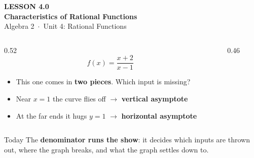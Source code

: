 \documentclass[aspectratio=169, 11pt]{beamer}
\newcommand{\lgrid}[4]{%
  \draw[step=1, linegray!45, thin] (#1,#3) grid (#2,#4);
  \draw[->, thick, charcoal] (#1,0)--(#2,0) node[below right, font=\tiny]{$x$};
  \draw[->, thick, charcoal] (0,#3)--(0,#4) node[left, font=\tiny]{$y$};}
\begin{document}
{
\begin{frame}[plain]
  \vspace{2.8cm}\hspace{0.55cm}%
  \begin{minipage}{0.9\textwidth}
    {\color{goldacc}\bfseries\small LESSON 4.0}\\[0.5cm]
    {\color{white}\bfseries\LARGE Characteristics of Rational Functions}\\[1.2cm]
    {\color{forestmid}\small Algebra 2~$\cdot$~Unit 4: Rational Functions}
  \end{minipage}
\end{frame}
}

\begin{frame}[t, plain]
  \begin{columns}[T]
    \begin{column}{0.52\textwidth}
      \[ f(x) = \frac{x+2}{x-1} \]
      \begin{itemize}\setlength{\itemsep}{4pt}
        \item This one comes in \textbf{two pieces}. Which input is missing?
        \item Near $x=1$ the curve flies off $\to$ \textbf{vertical asymptote}
        \item At the far ends it hugs $y=1$ $\to$ \textbf{horizontal asymptote}
      \end{itemize}
    \end{column}
    \begin{column}{0.46\textwidth}
      \centering
    \end{column}
  \end{columns}
  \vspace{2pt}
  \begin{block}{Today}
    The \textbf{denominator runs the show}: it decides which inputs are thrown out, where the graph
    breaks, and what the graph settles down to.
  \end{block}
\end{frame}
\end{document}
